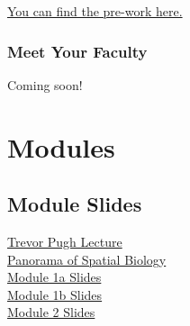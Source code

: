 \documentclass[
]{book}
\begin{document}
\href{https://docs.google.com/forms/d/e/1FAIpQLSeT3dlar3GpewcRe4Yjn5_Do0mR37brQ9eKeWmi2904_Q1AEw/viewform?usp=sf_link}{You can find the pre-work here.}

\hypertarget{meet-your-faculty}{%
\section{Meet Your Faculty}\label{meet-your-faculty}}

Coming soon!

\hypertarget{part-modules}{%
\part{Modules}\label{part-modules}}

\hypertarget{module-slides}{%
\chapter{Module Slides}\label{module-slides}}

\href{https://drive.google.com/file/d/1L0QxUN6YaxNonUczVfyQBeJ4-MWImSc7/view?usp=drive_link}{Trevor Pugh Lecture}\\
\href{https://drive.google.com/file/d/1t4Z5u5fH88hJtrOAU6dHRmmnHvMF_LJF/view?usp=sharing}{Panorama of Spatial Biology}\\
\href{https://drive.google.com/file/d/1nr1rJdjv05NfZzsp0gYgUITMqX9g_YS_/view?usp=drive_link}{Module 1a Slides}\\
\href{https://drive.google.com/file/d/1B5CHM_i0i16G2MN8nRQLDdOtkq1K3ZKM/view?usp=drive_link}{Module 1b Slides}\\
\href{https://drive.google.com/file/d/1faXyFrfshZ-IyUOo7IYaj2YJI3Y0e8LF/view?usp=drive_link}{Module 2 Slides}

  
\end{document}
